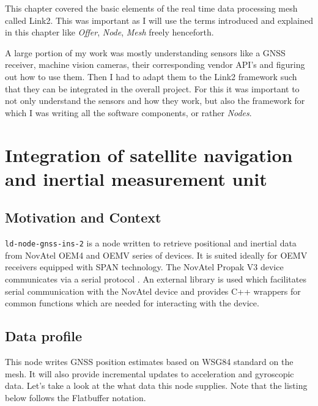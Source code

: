 \documentclass[a4paper, 12pt, oneside]{report}
\begin{document}
  \vspace{1.3 cm}
  \normalsize This chapter covered the basic elements of the real time data processing mesh called Link2. This was important as I will use the terms introduced and explained in this chapter like \textit{Offer}, \textit{Node}, \textit{Mesh} freely henceforth.
  
  A large portion of my work was mostly understanding sensors like a GNSS receiver, machine vision cameras, their corresponding vendor API's and figuring out how to use them. Then I had to adapt them to the Link2 framework such that they can be integrated in the overall project. For this it was important to not only understand the sensors and how they work, but also the framework for which I was writing all the software components, or rather \textit{Nodes}.
  
  \newpage
  
  
  \chapter{Integration of satellite navigation and inertial measurement unit}
  
  \section{Motivation and Context}
  
  \texttt{ld-node-gnss-ins-2} \cite{NumericalAdvantageldnodenovatelgnssins2ALink2nodetointerfacewiththeNovAtelPropakV3GNSSIMU-2020-02-20} is a node written to retrieve positional and inertial data from NovAtel \cite{ProPakV3TripleFrequencyGNSSReceiverHighPrecisionGNSSGPSReceiversNovAtelGNSSReceiverNovAtel-2020-02-12} OEM4 and OEMV series of devices. It is suited ideally for OEMV receivers equipped with SPAN \cite{-2014-10-09} technology.
  The NovAtel Propak V3 \cite{ProPakV3TripleFrequencyGNSSReceiverHighPrecisionGNSSGPSReceiversNovAtelGNSSReceiverNovAtel-2020-02-12} device communicates via a serial protocol \cite{SerialcommunicationWikipedia-2020-02-02}. An external library \cite{GAVLabnovatelInterfaceforNovatelGPSreceivers-2020-02-14} is used which facilitates serial communication with the NovAtel device and provides C++ wrappers for common functions which are needed for interacting with the device.
  
  \section{Data profile}
  This node writes GNSS position estimates based on WSG84 \cite{WorldGeodeticSystem1984Wikiwand-2020-02-14} standard on the mesh. It will also provide incremental updates to acceleration and gyroscopic data. 
  Let's take a look at the what data this node supplies. Note that the listing below follows the Flatbuffer \cite{FlatBuffersFlatBuffers-2019-06-20} notation.
  
\end{document}
